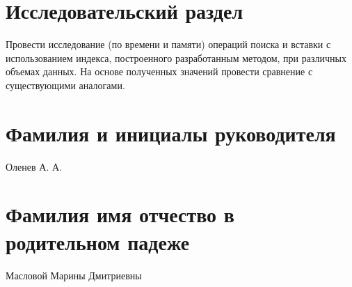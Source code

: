 \documentclass{bmstu}
\begin{document}
\section*{Исследовательский раздел}

Провести исследование (по времени и памяти) операций поиска и вставки с
использованием индекса, построенного разработанным методом, при
различных объемах данных. На основе полученных значений провести
сравнение с существующими аналогами.

\section*{Фамилия и инициалы руководителя}

Оленев А. А.

\section*{Фамилия имя отчество в родительном падеже}

Масловой Марины Дмитриевны
\end{document}
